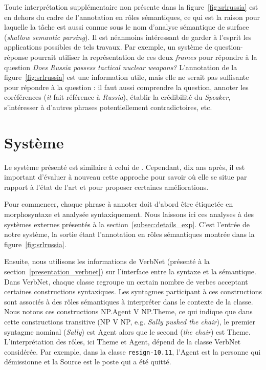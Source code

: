 Toute interprétation supplémentaire non présente dans la
figure~\ref{fig:srlrussia} est en dehors du cadre de l'annotation en rôles
sémantiques, ce qui est la raison pour laquelle la tâche est aussi connue sous
le nom d'analyse sémantique de surface (\emph{shallow semantic parsing}).  Il
est néanmoins intéressant de garder à l'esprit les applications possibles de
tels travaux. Par exemple, un système de question-réponse pourrait utiliser la
représentation de ces deux \emph{frames} pour répondre à la question \emph{Does
Russia possess tactical nuclear weapons?} L'annotation de la
figure~\ref{fig:srlrussia} est une information utile, mais elle ne serait pas
suffisante pour répondre à la question : il faut aussi comprendre la question,
annoter les coréférences (\emph{it} fait référence à \emph{Russia}), établir la
crédibilité du \emph{Speaker}, s'intéresser à d'autres phrases potentiellement
contradictoires, etc.

\section{Système}

Le système présenté est similaire à celui de
\cite{swier2004unsupervised,swier2005exploiting}. Cependant, dix ans après, il
est important d'évaluer à nouveau cette approche pour savoir où elle se situe
par rapport à l'état de l'art et pour proposer certaines améliorations.

Pour commencer, chaque phrase à annoter doit d'abord être étiquetée en
morphosyntaxe et analysée syntaxiquement. Nous laissons ici ces analyses à des
systèmes externes présentés à la section~\ref{subsec:details_exp}. C'est
l'entrée de notre système, la sortie étant l'annotation en rôles sémantiques
montrée dans la figure~\ref{fig:srlrussia}.

Ensuite, nous utilisons les informations de VerbNet (présenté à la
section~\ref{presentation_verbnet}) sur l'interface entre la syntaxe et la
sémantique. Dans VerbNet, chaque classe regroupe un certain nombre de verbes
acceptant certaines constructions syntaxiques. Les syntagmes participant à ces
constructions sont associés à des rôles sémantiques à interpréter dans le
contexte de la classe.  Nous notons ces constructions NP.Agent V NP.Theme, ce
qui indique que dans cette constructions transitive (NP V NP, e.g. \emph{Sally
pushed the chair}), le premier syntagme nominal (\emph{Sally}) est Agent alors
que le second (\emph{the chair}) est Theme. L'interprétation des rôles, ici
Theme et Agent, dépend de la classe VerbNet considérée. Par exemple, dans la
classe \texttt{resign-10.11}, l'Agent est la personne qui démissionne et la
Source est le poste qui a été quitté.

